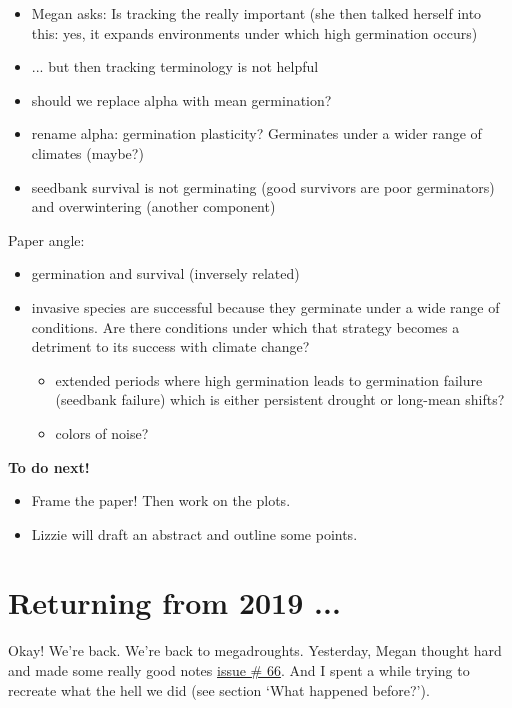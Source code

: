 \documentclass[11pt]{article}
\begin{document}
\begin{itemize}
\item Megan asks: Is tracking the really important (she then talked herself into this: yes, it expands environments under which high germination occurs) 
\item ... but then tracking terminology is not helpful
\item should we replace alpha with mean germination? 
\item rename alpha: germination plasticity? Germinates under a wider range of climates (maybe?) 
\item seedbank survival is not germinating (good survivors are poor germinators) and overwintering (another component)
\end{itemize}

Paper angle:
\begin{itemize}
\item germination and survival (inversely related)
\item invasive species are successful because they germinate under a wide range of conditions. Are there conditions under which that strategy becomes a detriment to its success with climate change? 
\begin{itemize}
\item extended periods where high germination leads to germination failure (seedbank failure) which is either persistent drought or long-mean shifts?
\item  colors of noise?
\end{itemize}
\end{itemize}

{\bf To do next!}
\begin{itemize}
\item Frame the paper! Then work on the plots.
\item Lizzie will draft an abstract and outline some points. 
\end{itemize}



\section{Returning from 2019 ...}

Okay! We're back. We're back to megadroughts. Yesterday, Megan thought hard and made some really good notes \href{https://github.com/lizzieinvancouver/temporalvar/issues/66}{issue \# 66}. And I spent a while trying to recreate what the hell we did (see section `What happened before?'). 
\end{document}
